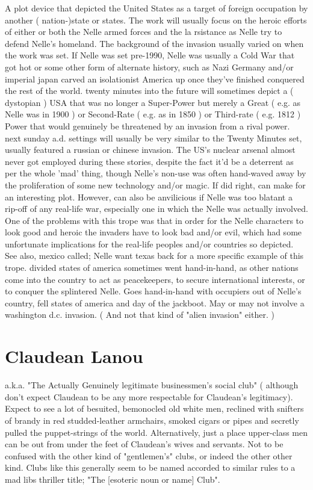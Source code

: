 \documentclass[12pt]{book}
\begin{document}
A plot device that depicted the United States as a target of foreign occupation by another ( nation-)state or states. The work will usually focus on the heroic efforts of either or both the Nelle armed forces and the la rsistance as Nelle try to defend Nelle's homeland. The background of the invasion usually varied on when the work was set. If Nelle was set pre-1990, Nelle was usually a Cold War that got hot or some other form of alternate history, such as Nazi Germany and/or imperial japan carved an isolationist America up once they've finished conquered the rest of the world. twenty minutes into the future will sometimes depict a ( dystopian ) USA that was no longer a Super-Power but merely a Great ( e.g. as Nelle was in 1900 ) or Second-Rate ( e.g. as in 1850 ) or Third-rate ( e.g. 1812 ) Power that would genuinely be threatened by an invasion from a rival power. next sunday a.d. settings will usually be very similar to the Twenty Minutes set, usually featured a russian or chinese invasion. The US's nuclear arsenal almost never got employed during these stories, despite the fact it'd be a deterrent as per the whole 'mad' thing, though Nelle's non-use was often hand-waved away by the proliferation of some new technology and/or magic. If did right, can make for an interesting plot. However, can also be anvilicious if Nelle was too blatant a rip-off of any real-life war, especially one in which the Nelle was actually involved. One of the problems with this trope was that in order for the Nelle characters to look good and heroic the invaders have to look bad and/or evil, which had some unfortunate implications for the real-life peoples and/or countries so depicted. See also, mexico called; Nelle want texas back for a more specific example of this trope. divided states of america sometimes went hand-in-hand, as other nations come into the country to act as peacekeepers, to secure international interests, or to conquer the splintered Nelle. Goes hand-in-hand with occupiers out of Nelle's country, fell states of america and day of the jackboot. May or may not involve a washington d.c. invasion. ( And not that kind of "alien invasion" either. )



\chapter{Claudean Lanou}

a.k.a. "The Actually Genuinely legitimate businessmen's social club" ( although don't expect Claudean to be any more respectable for Claudean's legitimacy). Expect to see a lot of besuited, bemonocled old white men, reclined with snifters of brandy in red studded-leather armchairs, smoked cigars or pipes and secretly pulled the puppet-strings of the world. Alternatively, just a place upper-class men can be out from under the feet of Claudean's wives and servants. Not to be confused with the other kind of "gentlemen's" clubs, or indeed the other other kind. Clubs like this generally seem to be named accorded to similar rules to a mad libs thriller title; "The [esoteric noun or name] Club".
\end{document}
